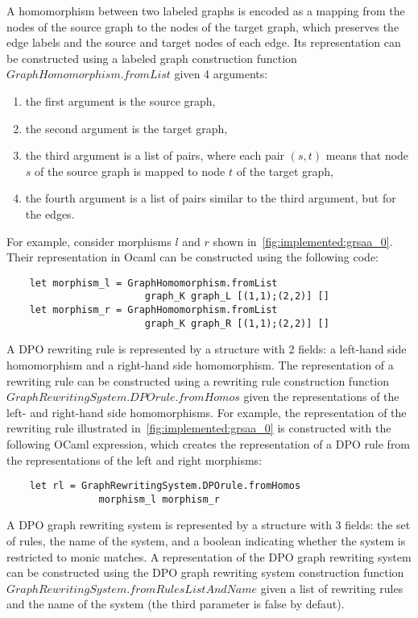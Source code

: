 A homomorphism between two labeled graphs is encoded as a mapping from the nodes of the source graph to the nodes of the target graph, which preserves the edge labels and the source and target nodes of each edge. Its representation can be constructed using a labeled graph construction function
\colorbox{Ivory2}{$GraphHomomorphism.fromList$} given 4 arguments:
    \begin{enumerate}
        \item the first argument is the source graph,
        \item the second argument is the target graph,
        \item the third argument is a list of pairs, where each pair $(s,t)$ means that node $s$ of the source graph is mapped to node $t$ of the target graph,
        \item the fourth argument is a list of pairs similar to the third argument, but for the edges.
    \end{enumerate}
For example, consider morphisms $l$ and $r$ shown in~\autoref{fig:implemented:grsaa_0}. Their representation in Ocaml can be constructed using the following code:
\begin{verbatim}
    let morphism_l = GraphHomomorphism.fromList 
                        graph_K graph_L [(1,1);(2,2)] []
    let morphism_r = GraphHomomorphism.fromList
                        graph_K graph_R [(1,1);(2,2)] []
\end{verbatim}

A DPO rewriting rule is represented by a structure with 2 fields: a left-hand side homomorphism and a right-hand side homomorphism. The representation of a rewriting rule can be constructed using a rewriting rule construction function \colorbox{Ivory2}{$GraphRewritingSystem.DPOrule.fromHomos$} given the representations of the left- and right-hand side homomorphisms.
For example, the representation of the rewriting rule illustrated in~\autoref{fig:implemented:grsaa_0} is constructed with the following OCaml expression, which creates the representation of a DPO rule from the representations of the left and right morphisms: 
\begin{verbatim}
    let rl = GraphRewritingSystem.DPOrule.fromHomos 
                morphism_l morphism_r
\end{verbatim}

A DPO graph rewriting system is represented by a structure with 3 fields: the set of rules, the name of the system, and a boolean indicating whether the system is restricted to monic matches. A representation of the DPO graph rewriting system
can be constructed using the DPO graph rewriting system construction function \colorbox{Ivory2}{$GraphRewritingSystem.fromRulesListAndName$} given a list of rewriting rules and the name of the system (the third parameter is false by defaut).

